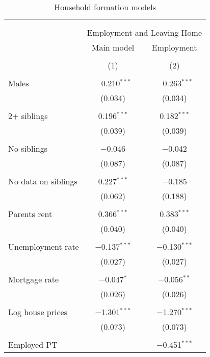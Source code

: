 
\begin{table}[!htbp] \centering 
  \caption{Household formation models} 
  \label{employed} 
\begin{tabular}{@{\extracolsep{1pt}}lcc} 
\\[-1.8ex]\hline 
\hline \\[-1.8ex] 
\\[-1.8ex] & \multicolumn{2}{c}{Employment and Leaving Home} \\ 
 & Main model & Employment \\ 
\\[-1.8ex] & (1) & (2)\\ 
\hline \\[-1.8ex] 
 Males & $-$0.210$^{***}$ & $-$0.263$^{***}$ \\ 
  & (0.034) & (0.034) \\ 
  & & \\ 
 2+ siblings & 0.196$^{***}$ & 0.182$^{***}$ \\ 
  & (0.039) & (0.039) \\ 
  & & \\ 
 No siblings & $-$0.046 & $-$0.042 \\ 
  & (0.087) & (0.087) \\ 
  & & \\ 
 No data on siblings & 0.227$^{***}$ & $-$0.185 \\ 
  & (0.062) & (0.188) \\ 
  & & \\ 
 Parents rent & 0.366$^{***}$ & 0.383$^{***}$ \\ 
  & (0.040) & (0.040) \\ 
  & & \\ 
 Unemployment rate & $-$0.137$^{***}$ & $-$0.130$^{***}$ \\ 
  & (0.027) & (0.027) \\ 
  & & \\ 
 Mortgage rate & $-$0.047$^{*}$ & $-$0.056$^{**}$ \\ 
  & (0.026) & (0.026) \\ 
  & & \\ 
 Log house prices & $-$1.301$^{***}$ & $-$1.270$^{***}$ \\ 
  & (0.073) & (0.073) \\ 
  & & \\ 
 Employed PT &  & $-$0.451$^{***}$ \\ 

\end{tabular}
\end{table}
